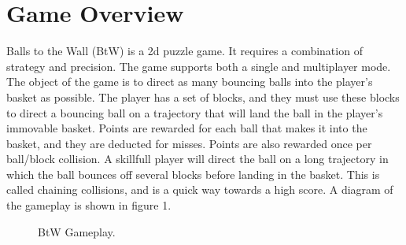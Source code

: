 \documentclass[12pt]{article} %
\begin{document}

\tableofcontents %

\newpage %


\section{Game Overview} %
Balls to the Wall (BtW) is a 2d puzzle game. It requires a combination of strategy and precision. The game supports both a single
and multiplayer mode. The object of the game is to direct as many bouncing balls into the player's basket as possible.
The player has a set of blocks, and they must use these blocks to direct a bouncing ball on a trajectory that will
land the ball in the player's immovable basket. Points are rewarded for each ball that makes it into the basket, and they are deducted
for misses. Points are also rewarded once per ball/block collision. A skillfull player will direct the ball on a long
trajectory in which the ball bounces off several blocks before landing in the basket. This is called chaining collisions,
and is a quick way towards a high score. A diagram of the gameplay is shown in figure 1.

\begin{figure}[H] %
\caption{BtW Gameplay.}
\label{fig:speciation}
\end{figure}
\end{document}
